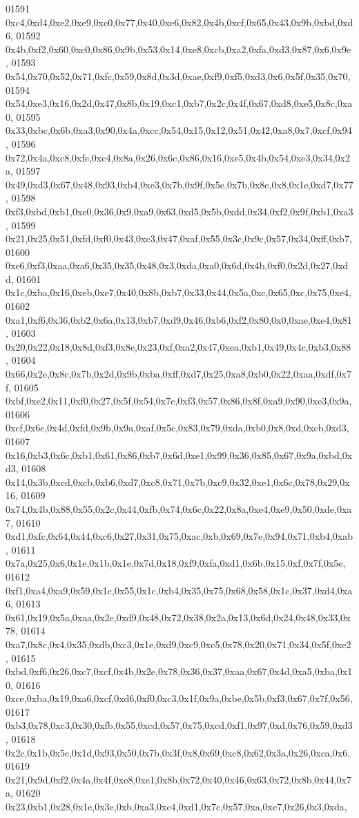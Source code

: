 \begin{DoxyCode}
01591   0xc4,0xd4,0xe2,0xe9,0xc0,0x77,0x40,0xe6,0x82,0x4b,0xcf,0x65,0x43,0x9b,0xbd,0xd6,
01592   0x4b,0xf2,0x60,0xc0,0x86,0x9b,0x53,0x14,0xe8,0xcb,0xa2,0xfa,0xd3,0x87,0x6,0x9e,
01593   0x54,0x70,0x52,0x71,0xfc,0x59,0x8d,0x3d,0xae,0xf9,0xf5,0xd3,0x6,0x5f,0x35,0x70,
01594   0x54,0xe3,0x16,0x2d,0x47,0x8b,0x19,0xc1,0xb7,0x2c,0x4f,0x67,0xd8,0xe5,0x8c,0xa0,
01595   0x33,0xbc,0x6b,0xa3,0x90,0x4a,0xcc,0x54,0x15,0x12,0x51,0x42,0xa8,0x7,0xcf,0x94,
01596   0x72,0x4a,0xc8,0xfe,0xc4,0x8a,0x26,0x6c,0x86,0x16,0xe5,0x4b,0x54,0xe3,0x34,0x2a,
01597   0x49,0xd3,0x67,0x48,0x93,0xb4,0xe3,0x7b,0x9f,0x5e,0x7b,0x8c,0x8,0x1e,0xd7,0x77,
01598   0xf3,0xbd,0xb1,0xe0,0x36,0x9,0xa9,0x63,0xd5,0x5b,0xdd,0x34,0xf2,0x9f,0xb1,0xa3,
01599   0x21,0x25,0x51,0xfd,0xf0,0x43,0xc3,0x47,0xaf,0x55,0x3c,0x9c,0x57,0x34,0xff,0xb7,
01600   0xe6,0xf3,0xaa,0xa6,0x35,0x35,0x48,0x3,0xda,0xa0,0x6d,0x4b,0xf0,0x2d,0x27,0xdd,
01601   0x1c,0xba,0x16,0xeb,0xe7,0x40,0x8b,0xb7,0x33,0x44,0x5a,0xc,0x65,0xc,0x75,0xe4,
01602   0xa1,0xf6,0x36,0xb2,0x6a,0x13,0xb7,0xd9,0x46,0xb6,0xf2,0x80,0x0,0xae,0xe4,0x81,
01603   0x20,0x22,0x18,0x8d,0xf3,0x8e,0x23,0xf,0xa2,0x47,0xea,0xb1,0x49,0x4c,0xb3,0x88,
01604   0x66,0x2e,0x8c,0x7b,0x2d,0x9b,0xba,0xff,0xd7,0x25,0xa8,0xb0,0x22,0xaa,0xdf,0x7f,
01605   0xbf,0xe2,0x11,0xf0,0x27,0x5f,0x54,0x7c,0xf3,0x57,0x86,0x8f,0xa9,0x90,0xe3,0x9a,
01606   0xcf,0x6c,0x4d,0xfd,0x9b,0x9a,0xaf,0x5c,0x83,0x79,0xda,0xb0,0x8,0xd,0xcb,0xd3,
01607   0x16,0xb3,0x6c,0xb1,0x61,0x86,0xb7,0x6d,0xe1,0x99,0x36,0x85,0x67,0x9a,0xbd,0xd3,
01608   0x14,0x3b,0xcd,0xcb,0xb6,0xd7,0xc8,0x71,0x7b,0xc9,0x32,0xe1,0x6c,0x78,0x29,0x16,
01609   0x74,0x4b,0x88,0x55,0x2c,0x44,0xfb,0x74,0x6c,0x22,0x8a,0xe4,0xe9,0x50,0xde,0xa7,
01610   0xd1,0xfc,0x64,0x44,0xc6,0x27,0x31,0x75,0xac,0xb,0x69,0x7e,0x94,0x71,0xb4,0xab,
01611   0x7a,0x25,0x6,0x1e,0x1b,0x1e,0x7d,0x18,0xf9,0xfa,0xd1,0x6b,0x15,0xf,0x7f,0x5e,
01612   0xf1,0xa4,0xa9,0x59,0x1c,0x55,0x1c,0xb4,0x35,0x75,0x68,0x58,0x1c,0x37,0xd4,0xa6,
01613   0x61,0x19,0x5a,0xaa,0x2e,0xd9,0x48,0x72,0x38,0x2a,0x13,0x6d,0x24,0x48,0x33,0x78,
01614   0xa7,0x8c,0x4,0x35,0xdb,0xc3,0x1e,0xd9,0xc9,0xc5,0x78,0x20,0x71,0x34,0x5f,0xe2,
01615   0xbd,0xf6,0x26,0xc7,0xcf,0x4b,0x2e,0x78,0x36,0x37,0xaa,0x67,0x4d,0xa5,0xba,0x10,
01616   0xce,0xba,0x19,0xa6,0xcf,0xd6,0xf0,0xc3,0x1f,0x9a,0xbe,0x5b,0xf3,0x67,0x7f,0x56,
01617   0xb3,0x78,0xc3,0x30,0xfb,0x55,0xcd,0x57,0x75,0xcd,0xf1,0x97,0xd,0x76,0x59,0xd3,
01618   0x2c,0x1b,0x5c,0x1d,0x93,0x50,0x7b,0x3f,0x8,0x69,0xc8,0x62,0x3a,0x26,0xca,0x6,
01619   0x21,0x9d,0xf2,0x4a,0x4f,0xe8,0xe1,0x8b,0x72,0x40,0x46,0x63,0x72,0x8b,0x44,0x7a,
01620   0x23,0xb1,0x28,0x1e,0x3e,0xb,0xa3,0xc4,0xd1,0x7c,0x57,0xa,0xe7,0x26,0x3,0xda,

\end{DoxyCode}
